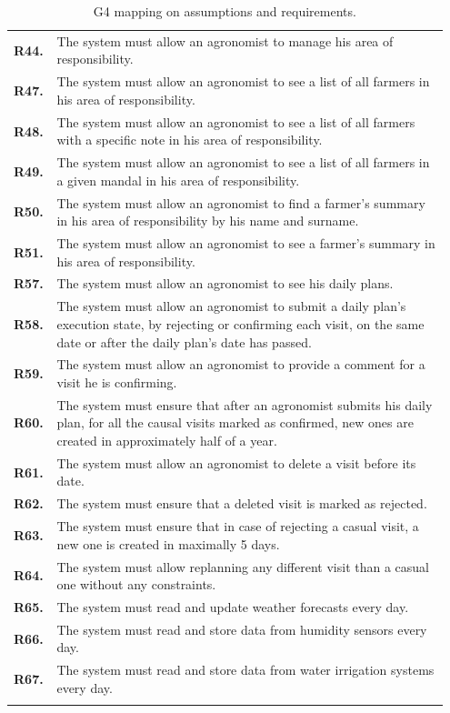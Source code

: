 \begin{longtable}{p{0.07\linewidth} p{0.88\linewidth}}
	\textbf{R44.} & The system must allow an agronomist to manage his area of responsibility.\\
	\textbf{R47.} & The system must allow an agronomist to see a list of all farmers in his area of responsibility.\\
	\textbf{R48.} & The system must allow an agronomist to see a list of all farmers with a specific note in his area of responsibility.\\
	\textbf{R49.} & The system must allow an agronomist to see a list of all farmers in a given mandal in his area of responsibility.\\
	\textbf{R50.} & The system must allow an agronomist to find a farmer's summary in his area of responsibility by his name and surname.\\
	\textbf{R51.} & The system must allow an agronomist to see a farmer's summary in his area of responsibility.\\
	\textbf{R57.} & The system must allow an agronomist to see his daily plans.\\
	\textbf{R58.} & The system must allow an agronomist to submit a daily plan's execution state, by rejecting or confirming each visit, on the same date or after the daily plan's date has passed. \\
	\textbf{R59.} & The system must allow an agronomist to provide a comment for a visit he is confirming.\\
	\textbf{R60.} & The system must ensure that after an agronomist submits his daily plan, for all the causal visits marked as confirmed, new ones are created in approximately half of a year.\\
	\textbf{R61.} & The system must allow an agronomist to delete a visit before its date.\\
	\textbf{R62.} & The system must ensure that a deleted visit is marked as rejected.\\
	\textbf{R63.} & The system must ensure that in case of rejecting a casual visit, a new one is created in maximally 5 days.\\
	\textbf{R64.} & The system must allow replanning any different visit than a casual one without any constraints.\\
	
	\textbf{R65.} & The system must read and update weather forecasts every day. \\
	\textbf{R66.} & The system must read and store data from humidity sensors every day. \\
	\textbf{R67.} & The system must read and store data from water irrigation systems every day. \\
    
    \bottomrule
    \caption{G4 mapping on assumptions and requirements.}
\end{longtable}
    

